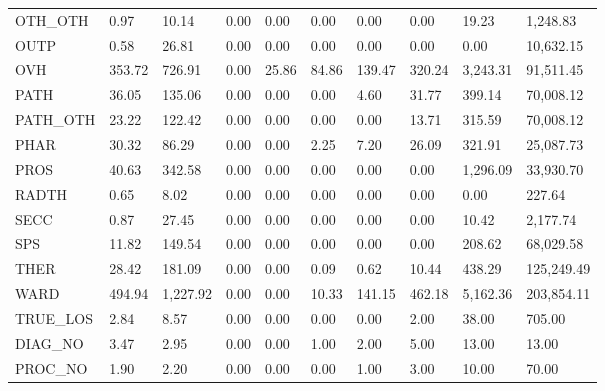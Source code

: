 \begin{tabular}{llllllllll}
OTH\_OTH  &      0.97 &     10.14 &         0.00 &       0.00 &    0.00 &    0.00 &      0.00 &      19.23 &    1,248.83 \\
OUTP     &      0.58 &     26.81 &         0.00 &       0.00 &    0.00 &    0.00 &      0.00 &       0.00 &   10,632.15 \\
OVH      &    353.72 &    726.91 &         0.00 &      25.86 &   84.86 &  139.47 &    320.24 &   3,243.31 &   91,511.45 \\
PATH     &     36.05 &    135.06 &         0.00 &       0.00 &    0.00 &    4.60 &     31.77 &     399.14 &   70,008.12 \\
PATH\_OTH &     23.22 &    122.42 &         0.00 &       0.00 &    0.00 &    0.00 &     13.71 &     315.59 &   70,008.12 \\
PHAR     &     30.32 &     86.29 &         0.00 &       0.00 &    2.25 &    7.20 &     26.09 &     321.91 &   25,087.73 \\
PROS     &     40.63 &    342.58 &         0.00 &       0.00 &    0.00 &    0.00 &      0.00 &   1,296.09 &   33,930.70 \\
RADTH    &      0.65 &      8.02 &         0.00 &       0.00 &    0.00 &    0.00 &      0.00 &       0.00 &      227.64 \\
SECC     &      0.87 &     27.45 &         0.00 &       0.00 &    0.00 &    0.00 &      0.00 &      10.42 &    2,177.74 \\
SPS      &     11.82 &    149.54 &         0.00 &       0.00 &    0.00 &    0.00 &      0.00 &     208.62 &   68,029.58 \\
THER     &     28.42 &    181.09 &         0.00 &       0.00 &    0.09 &    0.62 &     10.44 &     438.29 &  125,249.49 \\
WARD     &    494.94 &  1,227.92 &         0.00 &       0.00 &   10.33 &  141.15 &    462.18 &   5,162.36 &  203,854.11 \\
TRUE\_LOS &      2.84 &      8.57 &         0.00 &       0.00 &    0.00 &    0.00 &      2.00 &      38.00 &      705.00 \\
DIAG\_NO  &      3.47 &      2.95 &         0.00 &       0.00 &    1.00 &    2.00 &      5.00 &      13.00 &       13.00 \\
PROC\_NO  &      1.90 &      2.20 &         0.00 &       0.00 &    0.00 &    1.00 &      3.00 &      10.00 &       70.00 \\
\bottomrule
\end{tabular}
